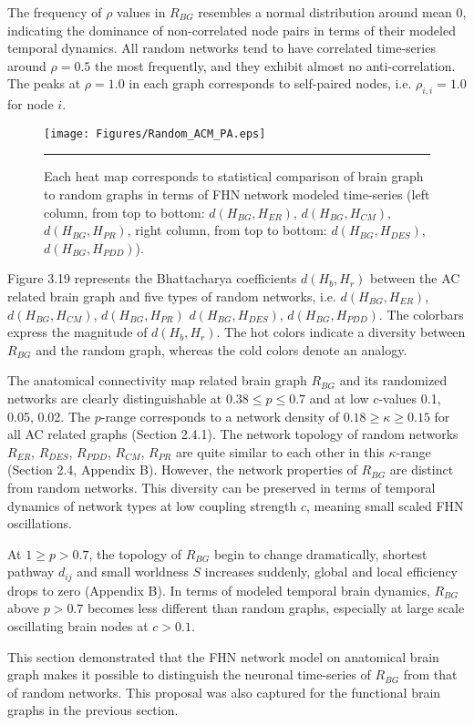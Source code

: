 The frequency of $\rho$ values in $R_{BG}$ resembles a normal distribution around mean 0, indicating the dominance of non-correlated node pairs in terms of their modeled temporal dynamics. All random networks tend to have correlated time-series around $\rho=0.5$ the most frequently, and they exhibit almost no anti-correlation. The peaks at $\rho =1.0$ in each graph corresponds to self-paired nodes, i.e. $\rho_{i,i}=1.0$ for node $i$.  



\begin{figure}[htbp]
 
  \centering

	 \texttt{[image: Figures/Random\_ACM\_PA.eps]}

	  \rule{35em}{0.5pt}  
  \caption[Random Graph Comparison, ACM]{ Each heat map corresponds to statistical comparison of brain graph to random graphs in terms of FHN network modeled time-series (left column, from top to bottom: $d(H_{BG}, H_{ER})$, $d(H_{BG}, H_{CM})$, $d(H_{BG}, H_{PR})$, right column, from top to bottom: $d(H_{BG}, H_{DES})$, $d(H_{BG}, H_{PDD})$). }
    \label{fig:Random Graph Comparison, ACM}
 	
\end{figure}  


Figure 3.19 represents the Bhattacharya coefficients $d(H_b,H_r)$ between the AC related brain  graph and five types of random networks, i.e.  $d(H_{BG}, H_{ER})$, $d(H_{BG}, H_{CM})$, $d(H_{BG}, H_{PR})$ $d(H_{BG}, H_{DES})$, $d(H_{BG}, H_{PDD})$. The colorbars express the magnitude of $d(H_b,H_r)$. The hot colors indicate a diversity between $R_{BG}$ and the random graph, whereas the cold colors denote an analogy. 

The anatomical connectivity map related brain graph $R_{BG}$ and its randomized networks are clearly distinguishable at $ 0.38 \leq p \leq 0.7$ and at low $c$-values 0.1, 0.05, 0.02. The $p$-range corresponds to a network density of $ 0.18 \geq \kappa \geq 0.15 $ for all AC related graphs (Section 2.4.1). The network topology of random networks $R_{ER}$, $R_{DES}$, $R_{PDD}$, $R_{CM}$, $R_{PR}$ are quite similar to each other in this $\kappa$-range (Section 2.4, Appendix B). However, the network properties of $R_{BG}$ are distinct from random networks. This diversity can be preserved in terms of temporal dynamics of network types at low coupling strength $c$, meaning small scaled FHN oscillations. 

At $1 \geq p>0.7$, the topology of $R_{BG}$ begin to change dramatically, shortest pathway $d_{ij}$ and small worldness $S$ increases suddenly, global and local efficiency drops to zero (Appendix B). In terms of modeled temporal brain dynamics, $R_{BG}$ above $p>0.7$ becomes less different than random graphs, especially at large scale oscillating brain nodes at $c>0.1$.  
 
This section demonstrated that the FHN network model on anatomical brain graph makes it possible to distinguish the neuronal time-series of $R_{BG}$ from that of random networks. This proposal was also captured for the functional brain graphs in the previous section. 


 
